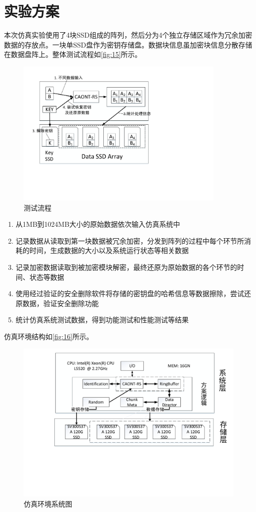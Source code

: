 \section{实验方案}
本次仿真实验使用了4块SSD组成的阵列，然后分为4个独立存储区域作为冗余加密数据的存放点。一块单SSD盘作为密钥存储盘。数据块信息虽加密块信息分散存储在数据盘阵上。整体测试流程如\autoref{fig:15}所示。
\begin{figure}[H]
	\centering
	\includegraphics[width=4in]{Pics/test-pr.pdf}
	\caption{测试流程}
	\label{fig:15}
\end{figure}
\begin{enumerate}
	\item 从1MB到1024MB大小的原始数据依次输入仿真系统中
	\item 记录数据从读取到第一块数据被冗余加密，分发到阵列的过程中每个环节所消耗的时间，生成数据的大小以及系统运行状态等相关数据
	\item 记录加密数据读取到被加密模块解密，最终还原为原始数据的各个环节的时间、状态等数据
	\item 使用经过验证的安全删除软件将存储的密钥盘的哈希信息等数据擦除，尝试还原数据，验证安全删除功能
	\item 统计仿真系统测试数据，得到功能测试和性能测试等结果
\end{enumerate}
仿真环境结构如\autoref{fig:16}所示。
\begin{figure}[htb]
	\centering
	\includegraphics[width=1\textwidth]{Pics/test-env.pdf}
	\caption{仿真环境系统图}
	\label{fig:16}
\end{figure}

